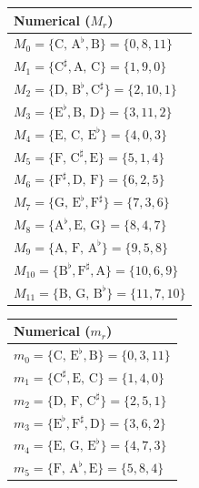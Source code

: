 \documentclass[11pt,letterpaper]{amsart}
\begin{document}
{\tiny \begin{table}[H]
    \centering
    \begin{minipage}{0.48\textwidth}
        \centering
        \begin{tabular}{l}
        \toprule
        \textbf{Numerical ($M_r$)} \\
        \midrule
        $M_0 = \{\text{C, A}^\flat, \text{B}\} = \{0, 8, 11\}$ \\
        $M_1 = \{\text{C}^\sharp, \text{A, C}\} = \{1, 9, 0\}$ \\
        $M_2 = \{\text{D, B}^\flat, \text{C}^\sharp\} = \{2, 10, 1\}$ \\
        $M_3 = \{\text{E}^\flat, \text{B, D}\} = \{3, 11, 2\}$ \\
        $M_4 = \{\text{E, C, E}^\flat\} = \{4, 0, 3\}$ \\
        $M_5 = \{\text{F, C}^\sharp, \text{E}\} = \{5, 1, 4\}$ \\
        $M_6 = \{\text{F}^\sharp, \text{D, F}\} = \{6, 2, 5\}$ \\
        $M_7 = \{\text{G, E}^\flat, \text{F}^\sharp\} = \{7, 3, 6\}$ \\
        $M_8 = \{\text{A}^\flat, \text{E, G}\} = \{8, 4, 7\}$ \\
        $M_9 = \{\text{A, F, A}^\flat\} = \{9, 5, 8\}$ \\
        $M_{10} = \{\text{B}^\flat, \text{F}^\sharp, \text{A}\} = \{10, 6, 9\}$ \\
        $M_{11} = \{\text{B, G, B}^\flat\} = \{11, 7, 10\}$ \\
        \bottomrule
        \end{tabular}
    \end{minipage}\hfill
    \begin{minipage}{0.48\textwidth}
        \centering
        \begin{tabular}{l}
        \toprule
        \textbf{Numerical ($m_r$)} \\
        \midrule
        $m_0 = \{\text{C, E}^\flat, \text{B}\} = \{0, 3, 11\}$ \\
        $m_1 = \{\text{C}^\sharp, \text{E, C}\} = \{1, 4, 0\}$ \\
        $m_2 = \{\text{D, F, C}^\sharp\} = \{2, 5, 1\}$ \\
        $m_3 = \{\text{E}^\flat, \text{F}^\sharp, \text{D}\} = \{3, 6, 2\}$ \\
        $m_4 = \{\text{E, G, E}^\flat\} = \{4, 7, 3\}$ \\
        $m_5 = \{\text{F, A}^\flat, \text{E}\} = \{5, 8, 4\}$ \\

\end{tabular}
\end{minipage}
\end{table}}
\end{document}
